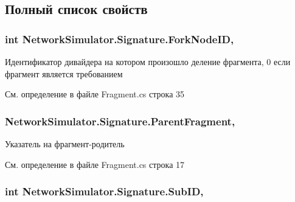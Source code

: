 \subsection{Полный список свойств}
\subsubsection[{\texorpdfstring{Fork\+Node\+ID}{ForkNodeID}}]{\setlength{\rightskip}{0pt plus 5cm}int Network\+Simulator.\+Signature.\+Fork\+Node\+ID\hspace{0.3cm}{\ttfamily [get]}, {\ttfamily [set]}}\hypertarget{class_network_simulator_1_1_signature_ad1296ff97d325ac85896bf9a1d4d5247}{}\label{class_network_simulator_1_1_signature_ad1296ff97d325ac85896bf9a1d4d5247}


Идентификатор дивайдера на котором произошло деление фрагмента, 0 если фрагмент является требованием 



См. определение в файле Fragment.\+cs строка 35

\subsubsection[{\texorpdfstring{Parent\+Fragment}{ParentFragment}}]{ Network\+Simulator.\+Signature.\+Parent\+Fragment\hspace{0.3cm}{\ttfamily [get]}, {\ttfamily [set]}}\hypertarget{class_network_simulator_1_1_signature_ac9b2e402433d945c4fa8a7722bfe9ecc}{}\label{class_network_simulator_1_1_signature_ac9b2e402433d945c4fa8a7722bfe9ecc}


Указатель на фрагмент-\/родитель 



См. определение в файле Fragment.\+cs строка 17

\subsubsection[{\texorpdfstring{Sub\+ID}{SubID}}]{\setlength{\rightskip}{0pt plus 5cm}int Network\+Simulator.\+Signature.\+Sub\+ID\hspace{0.3cm}{\ttfamily [get]}, {\ttfamily [set]}}\hypertarget{class_network_simulator_1_1_signature_ab571d5b84e1f7866a6ab6f6d79bc86d9}{}\label{class_network_simulator_1_1_signature_ab571d5b84e1f7866a6ab6f6d79bc86d9}


